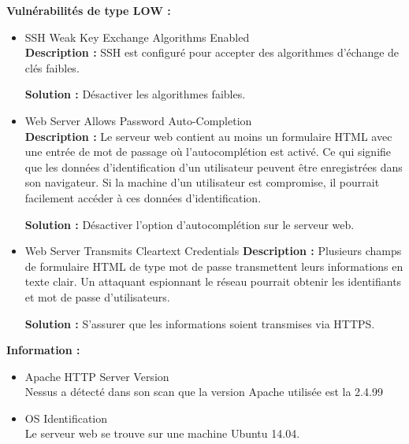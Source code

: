 \documentclass[french,paper=a4,oneside,captions=tableheading]{article}
\begin{document}
\textbf{Vulnérabilités de type LOW :}\\

\begin{itemize}
    \item SSH Weak Key Exchange Algorithms Enabled\\
\textbf{Description :}
SSH est configuré pour accepter des algorithmes d'échange de clés faibles.

\textbf{Solution :}
Désactiver les algorithmes faibles.\\

    \item Web Server Allows Password Auto-Completion\\
\textbf{Description :}
Le serveur web contient au moins un formulaire HTML avec une entrée de mot de passage où l'autocomplétion est activé. Ce qui signifie que les données d'identification d'un utilisateur peuvent être enregistrées dans son navigateur. Si la machine d'un utilisateur est compromise, il pourrait facilement accéder à ces données d'identification.

\textbf{Solution :}
Désactiver l'option d'autocomplétion sur le serveur web.\\

    \item Web Server Transmits Cleartext Credentials
\textbf{Description :}
Plusieurs champs de formulaire HTML de type mot de passe transmettent leurs informations en texte clair. Un attaquant espionnant le réseau pourrait obtenir les identifiants et mot de passe d'utilisateurs.

\textbf{Solution :}
S'assurer que les informations soient transmises via HTTPS.\\

\end{itemize}

\textbf{Information :} \\

\begin{itemize}
    \item Apache HTTP Server Version\\
Nessus a détecté dans son scan que la version Apache utilisée est la 2.4.99\\

    \item OS Identification\\
Le serveur web se trouve sur une machine Ubuntu 14.04.\\

\end{itemize}
\end{document}
